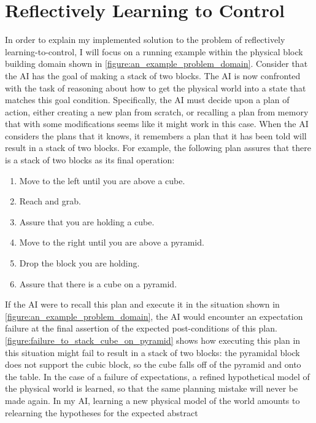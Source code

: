 \chapter{Reflectively Learning to Control}
\label{chapter:reflectively_learning_to_control}

In order to explain my implemented solution to the problem of
reflectively learning-to-control, I will focus on a running example
within the physical block building domain shown in
\autoref{figure:an_example_problem_domain}.  Consider that the AI has
the goal of making a stack of two blocks.  The AI is now confronted
with the task of reasoning about how to get the physical world into a
state that matches this goal condition.  Specifically, the AI must
decide upon a plan of action, either creating a new plan from scratch,
or recalling a plan from memory that with some modifications seems
like it might work in this case.  When the AI considers the plans that
it knows, it remembers a plan that it has been told will result in a
stack of two blocks.  For example, the following plan assures that
there is a stack of two blocks as its final operation:
\begin{enumerate}
\item Move to the left until you are above a cube.
\item Reach and grab.
\item Assure that you are holding a cube.
\item Move to the right until you are above a pyramid.
\item Drop the block you are holding.
\item Assure that there is a cube on a pyramid.
\end{enumerate}
If the AI were to recall this plan and execute it in the situation
shown in \autoref{figure:an_example_problem_domain}, the AI would
encounter an expectation failure at the final assertion of the
expected post-conditions of this plan.
{\mbox{\autoref{figure:failure_to_stack_cube_on_pyramid}}} shows how
executing this plan in this situation might fail to result in a stack
of two blocks: the pyramidal block does not support the cubic block,
so the cube falls off of the pyramid and onto the table.  In the case
of a failure of expectations, a refined hypothetical model of the
physical world is learned, so that the same planning mistake will
never be made again.  In my AI, learning a new physical model of the
world amounts to relearning the hypotheses for the expected abstract
